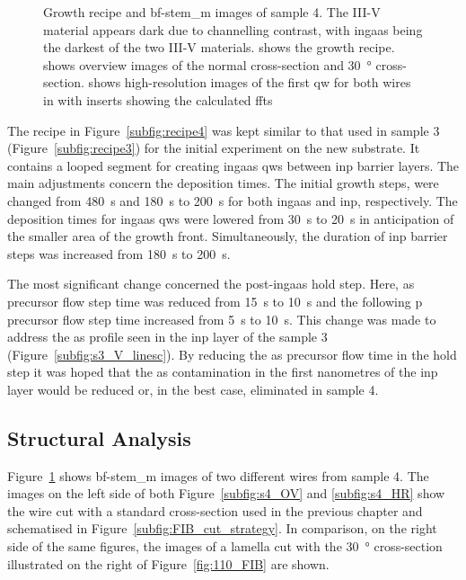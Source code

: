 \begin{figure}
{    }
    \caption{Growth recipe and \acs{bf}-\acs{stem_m} images of sample 4. The III-V material appears dark due to channelling contrast, with \acs{ingaas} being the darkest of the two III-V materials.  shows the growth recipe.  shows overview images of the normal cross-section and \qty{30}{\degree} cross-section.  shows high-resolution images of the first \acl{qw} for both wires in  with inserts showing the calculated \acs{fft}s}
    \label{fig:s4_recipe_STEM}
\end{figure}

The recipe in Figure~\ref{subfig:recipe4} was kept similar to that used in sample 3 (Figure~\ref{subfig:recipe3}) for the initial experiment on the new  substrate. It contains a looped segment for creating \acs{ingaas} \acl{qw}s between \acs{inp} barrier layers. The main adjustments concern the deposition times. The initial growth steps, were changed from \qty{480}{\second} and \qty{180}{\second} to \qty{200}{\second} for both \acs{ingaas} and \acs{inp}, respectively. The deposition times for \acs{ingaas} \acl{qw}s were lowered from \qty{30}{\second} to \qty{20}{\second} in anticipation of the smaller area of the growth front. Simultaneously, the duration of \acs{inp} barrier steps was increased from \qty{180}{\second} to \qty{200}{\second}.

The most significant change concerned the post-\acs{ingaas} hold step. Here, \acs{as} precursor flow step time was reduced from \qty{15}{s} to \qty{10}{s} and the following \acs{p} precursor flow step time increased from \qty{5}{s} to \qty{10}{s}. This change was made to address the \acs{as} profile seen in the \acs{inp} layer of the sample 3 (Figure~\ref{subfig:s3_V_linesc}). By reducing the \acs{as} precursor flow time in the hold step it was hoped that the \acs{as} contamination in the first nanometres of the \acs{inp} layer would be reduced or, in the best case, eliminated in sample 4.

\subsection{Structural Analysis}

Figure~\ref{fig:s4_recipe_STEM} shows \acs{bf}-\acs{stem_m} images of two different wires from sample 4. The images on the left side of both Figure~\ref{subfig:s4_OV} and \ref{subfig:s4_HR} show the wire cut with a standard cross-section used in the previous chapter and schematised in Figure~\ref{subfig:FIB_cut_strategy}. In comparison, on the right side of the same figures, the images of a lamella cut with the \qty{30}{\degree} cross-section illustrated on the right of Figure~\ref{fig:110_FIB} are shown. 

